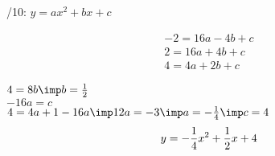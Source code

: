 /10:
\Pr $y  =  a x^2 + b x + c $

\begin{eqnarray}
	-2 = 16 a - 4 b + c\\
	2 = 16 a + 4 b + c \\
	4 = 4 a + 2 b  + c
\end{eqnarray}

$4 = 8 b \imp b = \f 12$\\
$-16a = c$\\
$4 = 4a +1 -16 a \imp 12 a = -3 \imp a = -\f 14 \imp c=4$
$$ y = - \frac 14 x^2 + \frac 12 x + 4$$
\EndDoc
